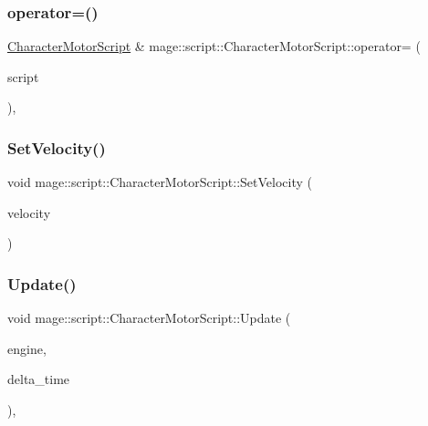 \subsubsection{\texorpdfstring{operator=()}{operator=()}\hspace{0.1cm}{\footnotesize\ttfamily [2/2]}}
{\footnotesize\ttfamily \hyperlink{classmage_1_1script_1_1_character_motor_script}{Character\+Motor\+Script} \& mage\+::script\+::\+Character\+Motor\+Script\+::operator= (\begin{DoxyParamCaption}\item[{\hyperlink{classmage_1_1script_1_1_character_motor_script}{Character\+Motor\+Script} \&\&}]{script }\end{DoxyParamCaption})\hspace{0.3cm}{\ttfamily [default]}, {\ttfamily [noexcept]}}

\hypertarget{classmage_1_1script_1_1_character_motor_script_a51c9b8317670fc0ae554bfb0cac11aee}{}\label{classmage_1_1script_1_1_character_motor_script_a51c9b8317670fc0ae554bfb0cac11aee} 
\subsubsection{\texorpdfstring{Set\+Velocity()}{SetVelocity()}}
{\footnotesize\ttfamily void mage\+::script\+::\+Character\+Motor\+Script\+::\+Set\+Velocity (\begin{DoxyParamCaption}\item[{\hyperlink{namespacemage_aa97e833b45f06d60a0a9c4fc22ae02c0}{F32}}]{velocity }\end{DoxyParamCaption})\hspace{0.3cm}{\ttfamily [noexcept]}}

\hypertarget{classmage_1_1script_1_1_character_motor_script_a1b74be732ab9124abe53b8890cceb365}{}\label{classmage_1_1script_1_1_character_motor_script_a1b74be732ab9124abe53b8890cceb365} 
\subsubsection{\texorpdfstring{Update()}{Update()}}
{\footnotesize\ttfamily void mage\+::script\+::\+Character\+Motor\+Script\+::\+Update (\begin{DoxyParamCaption}\item[{\mbox{[}\mbox{[}maybe\+\_\+unused\mbox{]} \mbox{]} \hyperlink{classmage_1_1_engine}{Engine} \&}]{engine,  }\item[{\mbox{[}\mbox{[}maybe\+\_\+unused\mbox{]} \mbox{]} \hyperlink{namespacemage_ad26233bbec640deda836e572c1a23708}{F64}}]{delta\+\_\+time }\end{DoxyParamCaption})\hspace{0.3cm}{\ttfamily [override]}, {\ttfamily [virtual]}}

